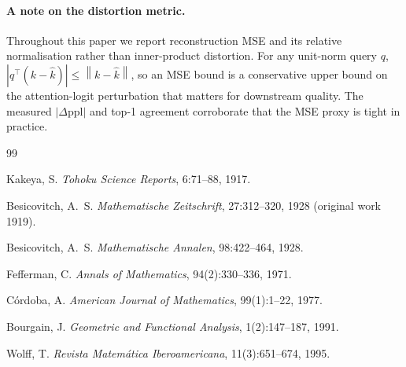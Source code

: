 \documentclass[11pt,a4paper]{article}
\theoremstyle{definition}
\theoremstyle{plain}
\newcommand{\norm}[1]{\left\lVert#1\right\rVert}
\newcommand{\abs}[1]{\left\lvert#1\right\rvert}
\begin{document}
\paragraph*{A note on the distortion metric.}
\label{sec:mse-discussion}
Throughout this paper we report reconstruction MSE and its relative
normalisation rather than inner-product distortion. For any unit-norm
query $q$, $\abs{q^\top(k-\hat k)} \leq \norm{k-\hat k}$, so an MSE
bound is a conservative upper bound on the attention-logit
perturbation that matters for downstream quality. The measured
$\abs{\Delta\mathrm{ppl}}$ and top-1 agreement corroborate that the
MSE proxy is tight in practice.

\begin{thebibliography}{99}


Kakeya, S.
\newblock \emph{Tohoku Science Reports}, 6:71--88, 1917.

Besicovitch, A.~S.
\newblock \emph{Mathematische Zeitschrift}, 27:312--320, 1928 (original work 1919).

Besicovitch, A.~S.
\newblock \emph{Mathematische Annalen}, 98:422--464, 1928.

Fefferman, C.
\newblock \emph{Annals of Mathematics}, 94(2):330--336, 1971.

C\'ordoba, A.
\newblock \emph{American Journal of Mathematics}, 99(1):1--22, 1977.

Bourgain, J.
\newblock \emph{Geometric and Functional Analysis}, 1(2):147--187, 1991.

Wolff, T.
\newblock \emph{Revista Matem\'atica Iberoamericana}, 11(3):651--674, 1995.


\end{thebibliography}
\end{document}
